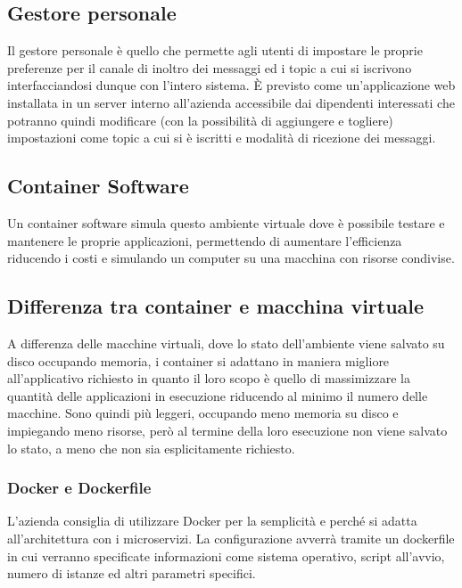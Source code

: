 	
	\subsection{Gestore personale}
	Il gestore personale è quello che permette agli utenti di impostare le proprie preferenze per il canale di inoltro dei messaggi ed i topic a cui si iscrivono interfacciandosi dunque con l'intero sistema.
	È previsto come un'applicazione web installata in un server interno all'azienda accessibile dai dipendenti interessati che potranno quindi modificare (con la possibilità di aggiungere e togliere) impostazioni come topic a cui si è iscritti e modalità di ricezione dei messaggi.
	
	\subsection{Container Software}
	
		Un container software simula questo ambiente virtuale dove è possibile testare e mantenere le proprie applicazioni, permettendo di aumentare l'efficienza riducendo i costi e simulando un computer su una macchina con risorse condivise.
		
		\subsection{Differenza tra container e macchina virtuale}
		A differenza delle macchine virtuali, dove lo stato dell'ambiente viene salvato su disco occupando memoria, i container si adattano in maniera migliore all'applicativo richiesto in quanto il loro scopo è quello di massimizzare la quantità delle applicazioni in esecuzione riducendo al minimo il numero delle macchine.
		Sono quindi più leggeri, occupando meno memoria su disco e impiegando meno risorse, però al termine della loro esecuzione non viene salvato lo stato, a meno che non sia esplicitamente richiesto.
		
		\subsubsection{Docker e Dockerfile}
		L'azienda consiglia di utilizzare Docker per la semplicità e perché si adatta all'architettura con i microservizi.
		La configurazione avverrà tramite un dockerfile in cui verranno specificate informazioni come sistema operativo, script all'avvio, numero di istanze ed altri parametri specifici.
